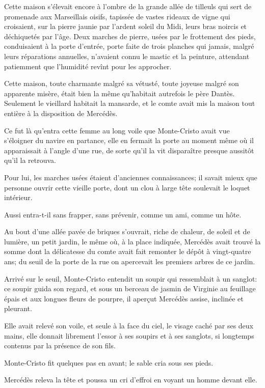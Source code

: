 Cette maison s'élevait encore à l'ombre de la grande allée de tilleuls qui sert de promenade aux Marseillais oisifs, tapissée de vastes rideaux de vigne qui croisaient, sur la pierre jaunie par l'ardent soleil du Midi, leurs bras noircis et déchiquetés par l'âge. Deux marches de pierre, usées par le frottement des pieds, conduisaient à la porte d'entrée, porte faite de trois planches qui jamais, malgré leurs réparations annuelles, n'avaient connu le mastic et la peinture, attendant patiemment que l'humidité revînt pour les approcher. 

Cette maison, toute charmante malgré sa vétusté, toute joyeuse malgré son apparente misère, était bien la même qu'habitait autrefois le père Dantès. Seulement le vieillard habitait la mansarde, et le comte avait mis la maison tout entière à la disposition de Mercédès. 

Ce fut là qu'entra cette femme au long voile que Monte-Cristo avait vue s'éloigner du navire en partance, elle en fermait la porte au moment même où il apparaissait à l'angle d'une rue, de sorte qu'il la vit disparaître presque aussitôt qu'il la retrouva. 

Pour lui, les marches usées étaient d'anciennes connaissances; il savait mieux que personne ouvrir cette vieille porte, dont un clou à large tête soulevait le loquet intérieur. 

Aussi entra-t-il sans frapper, sans prévenir, comme un ami, comme un hôte. 

Au bout d'une allée pavée de briques s'ouvrait, riche de chaleur, de soleil et de lumière, un petit jardin, le même où, à la place indiquée, Mercédès avait trouvé la somme dont la délicatesse du comte avait fait remonter le dépôt à vingt-quatre ans; du seuil de la porte de la rue on apercevait les premiers arbres de ce jardin. 

Arrivé sur le seuil, Monte-Cristo entendit un soupir qui ressemblait à un sanglot: ce soupir guida son regard, et sous un berceau de jasmin de Virginie au feuillage épais et aux longues fleurs de pourpre, il aperçut Mercédès assise, inclinée et pleurant. 

Elle avait relevé son voile, et seule à la face du ciel, le visage caché par ses deux mains, elle donnait librement l'essor à ses soupirs et à ses sanglots, si longtemps contenus par la présence de son fils. 

Monte-Cristo fit quelques pas en avant; le sable cria sous ses pieds. 

Mercédès releva la tête et poussa un cri d'effroi en voyant un homme devant elle. 

